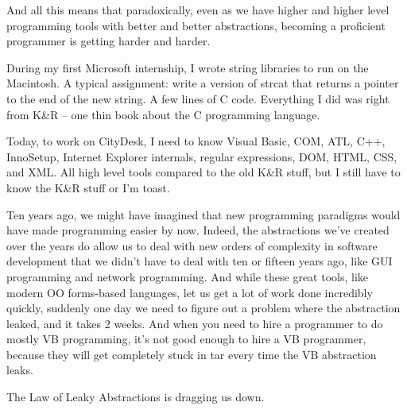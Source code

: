 \documentclass{article}
\begin{document}
And all this means that paradoxically, even as we have higher and higher level programming tools with better and better abstractions, becoming a proficient programmer is getting harder and harder.

During my first Microsoft internship, I wrote string libraries to run on the Macintosh. A typical assignment: write a version of strcat that returns a pointer to the end of the new string. A few lines of C code. Everything I did was right from K\&R -- one thin book about the C programming language.

Today, to work on CityDesk, I need to know Visual Basic, COM, ATL, C++, InnoSetup, Internet Explorer internals, regular expressions, DOM, HTML, CSS, and XML. All high level tools compared to the old K\&R stuff, but I still have to know the K\&R stuff or I'm toast.

Ten years ago, we might have imagined that new programming paradigms would have made programming easier by now. Indeed, the abstractions we've created over the years do allow us to deal with new orders of complexity in software development that we didn't have to deal with ten or fifteen years ago, like GUI programming and network programming. And while these great tools, like modern OO forms-based languages, let us get a lot of work done incredibly quickly, suddenly one day we need to figure out a problem where the abstraction leaked, and it takes 2 weeks. And when you need to hire a programmer to do mostly VB programming, it's not good enough to hire a VB programmer, because they will get completely stuck in tar every time the VB abstraction leaks.

The Law of Leaky Abstractions is dragging us down.

{}

\end{document}
